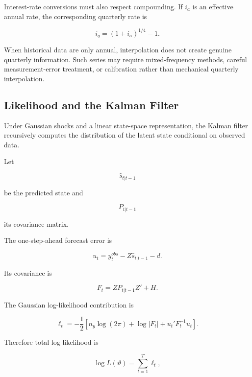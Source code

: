 Interest-rate conversions must also respect compounding. If \(i_a\) is an
effective annual rate, the corresponding quarterly rate is

\begin{equation}
i_q
=
(1+i_a)^{1/4}-1.
\end{equation}

When historical data are only annual, interpolation does not create genuine
quarterly information. Such series may require mixed-frequency methods,
careful measurement-error treatment, or calibration rather than mechanical
quarterly interpolation.

\subsection{Likelihood and the Kalman Filter}
\label{app:kalman}

Under Gaussian shocks and a linear state-space representation, the Kalman
filter recursively computes the distribution of the latent state conditional
on observed data.

Let

\[
\widehat s_{t|t-1}
\]

be the predicted state and

\[
P_{t|t-1}
\]

its covariance matrix.

The one-step-ahead forecast error is

\begin{equation}
u_t
=
y_t^{obs}
-
Z\widehat s_{t|t-1}
-d.
\end{equation}

Its covariance is

\begin{equation}
F_t
=
ZP_{t|t-1}Z'
+
H.
\end{equation}

The Gaussian log-likelihood contribution is

\begin{equation}
\ell_t
=
-\frac{1}{2}
\left[
n_y\log(2\pi)
+
\log|F_t|
+
u_t'F_t^{-1}u_t
\right].
\end{equation}

Therefore total log likelihood is

\begin{equation}
\boxed{
\log L(\vartheta)
=
\sum_{t=1}^{T}\ell_t,
}
\label{eq:likelihood}
\end{equation}

